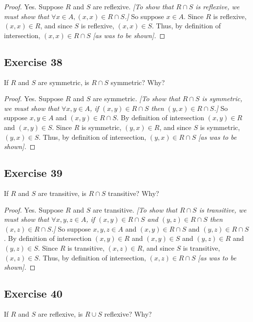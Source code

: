 \documentclass[14pt]{extarticle}
\begin{document}
\begin{proof}
Yes. Suppose $R$ and $S$ are reflexive. {\it [To show that \(R \cap S\) is reflexive, we must show that \(\forall x 
\in A, (x, x) \in R \cap S\).]} So suppose \(x \in A\). Since $R$ is reflexive, \((x, x) \in R\), and since $S$ is 
reflexive, \((x, x) \in S\). Thus, by definition of intersection, \((x, x) \in R \cap S\) {\it [as was to be shown].}
\end{proof}

\subsection{Exercise 38}
If \(R\) and \(S\) are symmetric, is \(R \cap S\) symmetric? Why?

\begin{proof}
Yes. Suppose $R$ and $S$ are symmetric. {\it [To show that \(R \cap S\) is symmetric, we must show that \(\forall x,y 
\in A\), if \((x, y) \in R \cap S\) then \((y, x) \in R \cap S\).]} So suppose \(x,y \in A\) and \((x, y) \in R 
\cap S\). By definition of intersection \((x, y) \in R\) and \((x,y)\in S\). Since $R$ is symmetric, \((y,x)\in R\), 
and since $S$ is symmetric, \((y, x) \in S\). Thus, by definition of intersection, \((y, x) \in R \cap S\) 
{\it [as was to be shown].}
\end{proof}

\subsection{Exercise 39}
If \(R\) and \(S\) are transitive, is \(R \cap S\) transitive? Why?

\begin{proof}
Yes. Suppose $R$ and $S$ are transitive. {\it [To show that \(R \cap S\) is transitive, we must show that \(\forall x,y 
,z \in A\), if \((x, y) \in R \cap S\) and \((y, z) \in R \cap S\) then \((x, z) \in R \cap S\).]} So suppose \(x,y,z 
\in A\) and \((x, y) \in R \cap S\) and \((y, z) \in R \cap S\). By definition of intersection \((x, y) \in R\) and 
\((x,y)\in S\) and \((y, z) \in R\) and \((y,z)\in S\). Since $R$ is transitive, \((x,z)\in R\), and since $S$ is 
transitive, \((x, z) \in S\). Thus, by definition of intersection, \((x, z) \in R \cap S\) {\it [as was to be shown].}
\end{proof}

\subsection{Exercise 40}
If \(R\) and \(S\) are reflexive, is \(R \cup S\) reflexive? Why?
\end{document}
